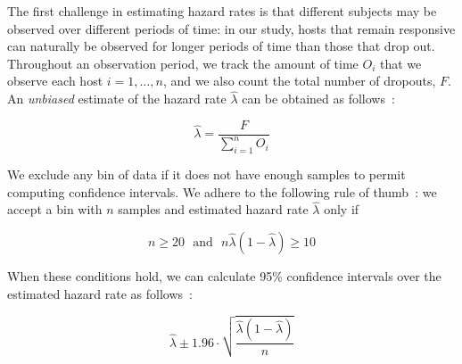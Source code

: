 The first challenge in estimating hazard rates is that different subjects may
be observed over different periods of time: in our study, hosts that remain
responsive can naturally be observed for longer periods of time than those that
drop out.
%
Throughout an observation period, we track the amount of time $O_i$ that we
observe each host $i = 1, \ldots, n$, and we also count the total number of
dropouts, $F$. 
%
An \emph{unbiased} estimate of the hazard rate $\hat{\lambda}$ can be obtained
as follows~\cite[Chapter 15.4]{biostats-book}:

\begin{equation}
\hat{\lambda} = \frac{F}{\sum_{i=1}^n O_i}
\label{eq:hazard}
\end{equation}

We exclude any bin of data if it does not have enough samples to permit
computing confidence intervals.
%
We adhere to the following rule of
thumb~\cite[Chapter~6]{biostats-book}: we accept a bin with $n$ samples
and estimated hazard rate $\hat{\lambda}$ only if 

\begin{equation}
	n \geq 20 ~~~\mbox{and}~~~ n\hat{\lambda}(1-\hat{\lambda}) \geq 10
	\label{eq:samples}
\end{equation}

\noindent
%
When these conditions hold, we can calculate 95\% confidence intervals
over the estimated hazard rate as
follows~\cite[Chapter~6.3]{biostats-book}:

\begin{equation}
	\hat{\lambda} \pm 1.96 \cdot
	\sqrt{\frac{\hat{\lambda}(1-\hat{\lambda})}{n}}
	\label{eq:hazard-conf}
\end{equation}



